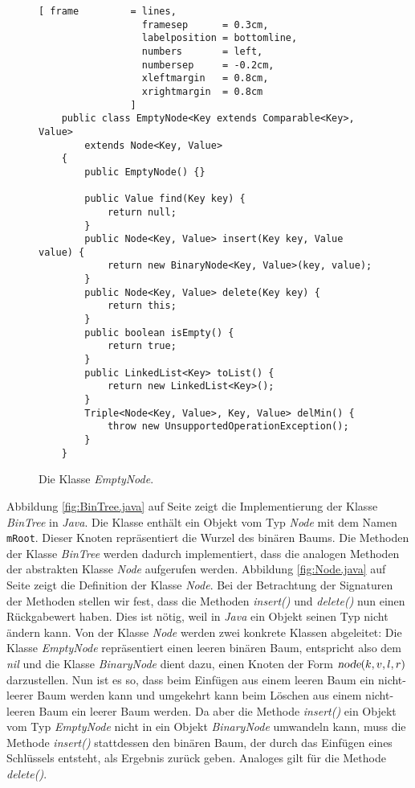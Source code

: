 \begin{figure}[!ht]
  \centering
\begin{Verbatim}[ frame         = lines, 
                  framesep      = 0.3cm, 
                  labelposition = bottomline,
                  numbers       = left,
                  numbersep     = -0.2cm,
                  xleftmargin   = 0.8cm,
                  xrightmargin  = 0.8cm
                ]
    public class EmptyNode<Key extends Comparable<Key>, Value> 
        extends Node<Key, Value>
    {
        public EmptyNode() {}
        
        public Value find(Key key) {
            return null;
        }        
        public Node<Key, Value> insert(Key key, Value value) {
            return new BinaryNode<Key, Value>(key, value);
        }        
        public Node<Key, Value> delete(Key key) {
            return this;
        }
        public boolean isEmpty() {
            return true;
        }    
        public LinkedList<Key> toList() {
            return new LinkedList<Key>();
        }
        Triple<Node<Key, Value>, Key, Value> delMin() {
            throw new UnsupportedOperationException();
        }
    }
\end{Verbatim}
\vspace*{-0.3cm}
  \caption{Die Klasse \textsl{EmptyNode}.}
  \label{fig:EmptyNode.java}
\end{figure}

Abbildung \ref{fig:BinTree.java} auf Seite \pageref{fig:BinTree.java} zeigt die 
Implementierung der Klasse \textsl{BinTree} in \textsl{Java}.  Die Klasse enth\"alt ein
Objekt vom Typ \textsl{Node} mit dem Namen \texttt{mRoot}.  Dieser Knoten repr\"asentiert
die Wurzel des bin\"aren Baums.  Die Methoden der Klasse \textsl{BinTree} werden dadurch
implementiert, dass die analogen Methoden der abstrakten Klasse \textsl{Node} aufgerufen
werden.  
Abbildung \ref{fig:Node.java} auf Seite \pageref{fig:Node.java} zeigt die Definition
der Klasse \textsl{Node}.  Bei der Betrachtung der Signaturen der Methoden stellen wir
fest, dass die Methoden \textsl{insert()} und \textsl{delete()} nun einen R\"uckgabewert
haben.   Dies ist n\"otig, weil in \textsl{Java} ein Objekt seinen Typ nicht \"andern kann.  
Von der Klasse \textsl{Node} werden zwei konkrete Klassen abgeleitet:  Die Klasse
\textsl{EmptyNode} repr\"asentiert einen leeren bin\"aren Baum, entspricht also dem
\textsl{nil} und die Klasse \textsl{BinaryNode} dient dazu, einen Knoten der Form
$\textsl{node}(k,v,l,r)$ darzustellen.  Nun ist es so, dass beim Einf\"ugen  aus
einem leeren Baum ein nicht-leerer Baum werden kann und umgekehrt kann beim L\"oschen 
aus einem nicht-leeren Baum ein leerer Baum werden.  Da aber die Methode \textsl{insert()}
ein Objekt vom Typ \textsl{EmptyNode} nicht in ein Objekt \textsl{BinaryNode} umwandeln
kann, muss die Methode \textsl{insert()} stattdessen den bin\"aren Baum, der durch das
Einf\"ugen eines Schl\"ussels entsteht, als  Ergebnis zur\"uck geben.  Analoges gilt f\"ur die
Methode \textsl{delete()}.

